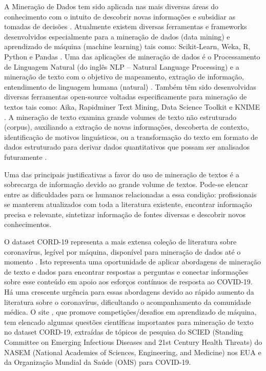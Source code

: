 \documentclass[
	12pt,				%
	a4paper,			%
	english,			%
	brazil,				%
	]{article}
\begin{document}
A Minera\c c\~ ao de Dados tem sido aplicada nas mais diversas \' areas
do conhecimento com o intuito de descobrir novas informa\c c\~ oes e
subsidiar as tomadas de decis\~ oes \cite{bramer2007principles, aggarwal2015data}.
Atualmente existem diversas ferramentas e frameworks desenvolvidos especialmente
para a minera\c c\~ ao de dados (data mining) e aprendizado de
m\' aquina (machine learning) tais como:
Scikit-Learn, Weka, R, Python e Pandas \cite{geron19}.
Uma das aplica\c c\~ oes de minera\c c\~ ao de dados \' e o Processamento
de Linguagem Natural (do ingl\^ es NLP – Natural Language Processing) e
a minera\c c\~ ao de texto com o objetivo de mapeamento,
extra\c c\~ ao de informa\c c\~ ao, entendimento de linguagem humana (natural) \cite{dinov2018data}.
Tamb\' em t\^ em sido desenvolvidas diversas ferramentas open-source
voltadas especificamente para minera\c c\~ ao de textos tais como:
Aika, Rapidminer Text Mining, Data Science Toolkit e KNIME \cite{kaur2016comparison}.
A minera\c c\~ ao de texto examina grande volumes de texto n\~ ao estruturado
(corpus), auxiliando a extra\c c\~ ao de novas informa\c c\~ oes,
descoberta de contexto, identifica\c c\~ ao de motivos lingu\' isticos,
ou a transformação do texto em formato de dados estruturado para derivar dados
quantitativos que possam ser analisados futuramente \cite{aggarwal2015data}.

Uma das principais justificativas a favor do uso de minera\c c\~ ao
de textos \' e a sobrecarga de informa\c c\~ ao devido ao grande volume
de textos. Pode-se elencar entre as dificuldades para os humanos relacionadas
a essa condi\c c\~ ao: profissionais se manterem atualizados com toda a
literatura existente, encontrar informa\c c\~ ao precisa e relevante,
sintetizar informa\c c\~ ao de fontes diversas e descobrir novos conhecimentos.

O dataset CORD-19 representa a mais extensa cole\c c\~ ao de literatura sobre coronav\' irus, leg\' ivel por m\' aquina, dispon\' ivel para minera\c c\~ ao de dados at\' e o momento \cite{kaggle20online}.
Isto representa uma oportunidade de aplicar abordagens de minera\c c\~ ao de texto e dados para encontrar respostas a perguntas e conectar informa\c c\~ oes sobre esse conte\' udo em apoio aos esfor\c cos cont\' inuos de resposta ao COVID-19.
H\' a uma crescente urg\^ encia para essas abordagens devido ao r\' apido aumento da literatura sobre o coronav\' irus, dificultando o acompanhamento da comunidade m\' edica.
O site , que promove competi\c c\~ oes/desafios em aprendizado de m\' aquina, tem elencado algumas quest\~ oes cient\' ificas importantes para minera\c c\~ ao de texto no dataset CORD-19, extra\' idas de t\' opicos de pesquisa do SCIED (Standing Committee on Emerging Infectious Diseases and 21st Century Health Threats) do NASEM (National Academies of Sciences, Engineering, and Medicine) nos EUA e da Organiza\c c\~ ao Mundial da Sa\' ude (OMS) para COVID-19.
\end{document}
